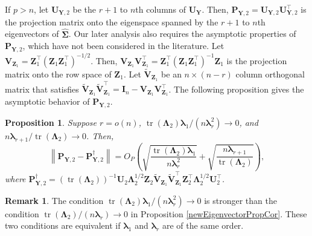 \documentclass[12pt]{article} %
\DeclareMathOperator{\mytr}{tr}
\newcommand{\bZ}{\mathbf{Z}}
\newcommand{\bP}{\mathbf{P}}
\newcommand{\bY}{\mathbf{Y}}
\newcommand{\bI}{\mathbf{I}}
\newcommand{\bU}{\mathbf{U}}
\newcommand{\bV}{\mathbf{V}}
\newcommand{\bfsym}[1]{\ensuremath{\boldsymbol{#1}}}
\def\blambda {\bfsym {\lambda}}
\def\bLambda {\bfsym {\Lambda}}
\def\bSigma {\bfsym {\Sigma}}
\newtheorem{proposition}{Proposition}
\theoremstyle{definition}
\newtheorem{remark}{Remark}
\begin{document}
If $p>n$, let $\bU_{\bY,2}$ be the $r+1$ to $n$th columns of $\bU_{\bY}$.
Then, $\bP_{\bY,2}=\bU_{\bY,2}\bU_{\bY,2}^\top$ is the projection matrix onto the eigenspace spanned by the $r+1$ to $n$th eigenvectors of $\hat{\bSigma}$.
Our later analysis also requires the asymptotic properties of $\bP_{\bY,2}$, which have not been considered in the literature.
    Let $\bV_{\bZ_1}=\bZ_1^\top (\bZ_1 \bZ_1^\top)^{-1/2}$.
    Then, $\bV_{\bZ_1}\bV_{\bZ_1}^\top=\bZ_1^\top (\bZ_1 \bZ_1^\top)^{-1}\bZ_1$ is the projection matrix onto the row space of $\bZ_1$.
    Let $\tilde{\bV}_{\bZ_1}$ be an $n\times (n-r)$ column orthogonal matrix that satisfies $\tilde{\bV}_{\bZ_1}\tilde{\bV}_{\bZ_1}^\top= \bI_{n}-\bV_{\bZ_1}\bV_{\bZ_1}^\top$.
    The following proposition gives the asymptotic behavior of $\bP_{\bY,2}$.

\begin{proposition}
    \label{eigenvectorprop3}
    Suppose $r=o(n)$, $\mytr(\bLambda_2)\blambda_1/(n\blambda_r^2)\to 0$, and $n\blambda_{r+1} /\mytr(\bLambda_2)\to 0$. Then,
    \begin{equation*}
            \left\|\bP_{\bY,2}-
            \bP_{\bY,2}^{\dagger}
            \right\|
    = 
    O_P\left(
        \sqrt{\frac{\mytr(\bLambda_2) \blambda_1}{n\blambda_r^2}}
    +
    \sqrt{\frac{n\blambda_{r+1}}{\mytr(\bLambda_2)}}\right),
    \end{equation*}
    where $
            \bP_{\bY,2}^{\dagger}=
            \left(\mytr(\bLambda_2)\right)^{-1}
            \bU_2 \bLambda_2^{1/2}\bZ_{2} \tilde{\bV}_{\bZ_1}
            \tilde{\bV}_{\bZ_1}^\top \bZ_2^\top \bLambda_2^{1/2} \bU_2^\top
            $.
\end{proposition}
\begin{remark}
    The condition $\mytr(\bLambda_2)\blambda_1/(n\blambda_r^2)\to 0$ is stronger than the condition $\mytr(\bLambda_2)/(n\blambda_r)\to 0$ in Proposition \ref{newEigenvectorPropCor}.
    These two conditions are equivalent if $\blambda_1$ and $\blambda_r$ are of the same order.
\end{remark}
\end{document}
